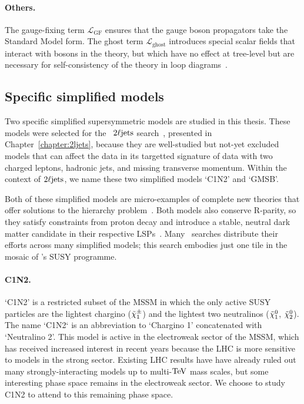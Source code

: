 \paragraph{Others.}
The gauge-fixing term $\mathcal{L}_\mathrm{GF}$ ensures that the gauge boson
propagators take the Standard Model form.
The ghost term $\mathcal{L}_\mathrm{ghost}$ introduces special scalar fields
that interact with bosons in the theory, but which have no effect at tree-level
but are necessary for self-consistency of the theory in loop
diagrams~\cite{martin2016primer, kuroda1999complete}.


\subsection{Specific simplified models}
Two specific simplified supersymmetric models are studied in this thesis.
These models were selected for the \atlas\ $\twoljets$
search~\cite{atlas2022searches},
presented in Chapter~\ref{chapter:2ljets},
because they are well-studied but not-yet excluded models that can affect the
data in its targetted signature of data with two charged leptons,
hadronic jets, and missing transverse momentum.
Within the context of $\twoljets$, we name these two simplified models
`C1N2' and `GMSB'.

Both of these simplified models are micro-examples of complete new theories
that offer solutions to the hierarchy
problem~\cite{Sakai:1981gr,SUSY-2018-02}.
Both models also conserve R-parity, so they satisfy constraints from proton
decay and introduce a stable, neutral dark matter candidate in their respective
LSPs~\cite{Ellis:1983ew}.
Many \atlas\ searches distribute their efforts across many simplified models;
this search embodies just one tile in the mosaic of \atlas's SUSY programme.

\paragraph{C1N2.}
`C1N2' is a restricted subset of the MSSM in which the only active SUSY
particles
are the lightest chargino ($\chargino_1$)
and the lightest two neutralinos ($\neutralino_1$, $\neutralino_2$).
The name `C1N2` is an abbreviation to
`Chargino 1' concatenated with `Neutralino 2'.
This model is active in the electroweak sector of the MSSM, which has received
increased interest in recent years because the LHC is more sensitive to models
in the strong sector.
Existing LHC results have have already ruled out many strongly-interacting
models up to multi-$\eV[T]$ mass scales, but some interesting phase space
remains in the electroweak sector.
We choose to study C1N2 to attend to this remaining phase space.

